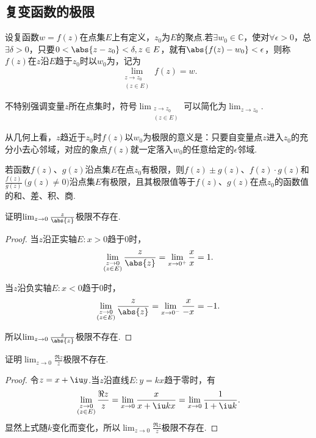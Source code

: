 \subsection{复变函数的极限}
\begin{definition}
设复函数\(w=f(z)\)在点集\(E\)上有定义，\(z_0\)为\(E\)的聚点.若\(\exists w_0 \in \mathbb{C}\)，使对\(\forall \epsilon > 0\)，总\(\exists \delta > 0\)，只要\(0<\abs{z-z_0}<\delta, z \in E\)，就有\(\abs{f(z)-w_0} < \epsilon\)，则称\(f(z)\)在\(z\)沿\(E\)趋于\(z_0\)时以\(w_0\)为，记为\[
\lim_{\substack{z \to z_0 \\ (z \in E)}} f(z) = w.
\]

不特别强调变量\(z\)所在点集时，符号\(\lim_{\substack{z \to z_0 \\ (z \in E)}}\)可以简化为\(\lim_{z \to z_0}\).
\end{definition}
从几何上看，\(z\)趋近于\(z_0\)时\(f(z)\)以\(w_0\)为极限的意义是：只要自变量点\(z\)进入\(z_0\)的充分小去心邻域，对应的象点\(f(z)\)就一定落入\(w_0\)的任意给定的\(\epsilon\)邻域.

\begin{theorem}
若函数\(f(z)\)、\(g(z)\)沿点集\(E\)在点\(z_0\)有极限，则\(f(z) \pm g(z)\)、\(f(z) \cdot g(z)\)和\(\frac{f(z)}{g(z)}\ \bigl(g(z) \neq 0\bigr)\)沿点集\(E\)有极限，且其极限值等于\(f(z)\)、\(g(z)\)在点\(z_0\)的函数值的和、差、积、商.
\end{theorem}

\begin{example}
证明\(\lim_{z\to0} \frac{z}{\abs{z}}\)极限不存在.
\begin{proof}
当\(z\)沿正实轴\(E: x > 0\)趋于\(0\)时，\[
\lim_{\substack{z\to0 \\ (z \in E)}} \frac{z}{\abs{z}}
= \lim_{x\to0^+} \frac{x}{x} = 1.
\]

当\(z\)沿负实轴\(E: x < 0\)趋于\(0\)时，\[
\lim_{\substack{z\to0 \\ (z \in E)}} \frac{z}{\abs{z}}
= \lim_{x\to0^-} \frac{x}{-x} = -1.
\]

所以\(\lim_{z\to0} \frac{z}{\abs{z}}\)极限不存在.
\end{proof}
\end{example}

\begin{example}
证明\(\lim_{z\to0} \frac{\Re z}{z}\)极限不存在.
\begin{proof}
令\(z = x + \iu y\).当\(z\)沿直线\(E: y = kx\)趋于零时，有\[
\lim_{\substack{z\to0 \\ (z \in E)}} \frac{\Re z}{z}
= \lim_{x\to0} \frac{x}{x + \iu kx}
= \lim_{x\to0} \frac{1}{1+\iu k}.
\]显然上式随\(k\)变化而变化，所以\(\lim_{z\to0} \frac{\Re z}{z}\)极限不存在.
\end{proof}
\end{example}

